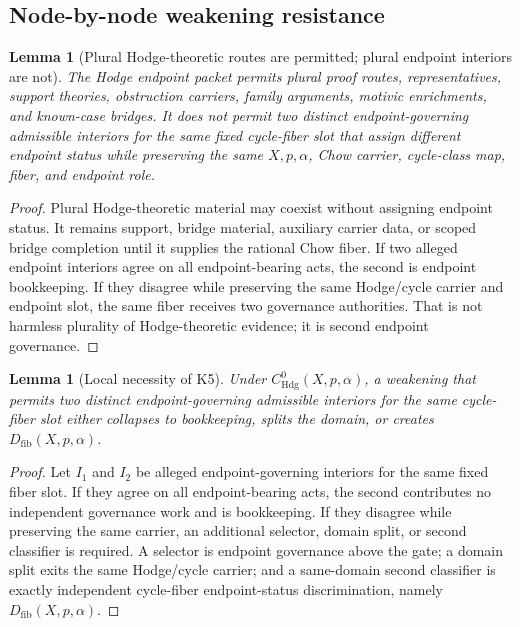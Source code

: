 \documentclass[11pt]{article}
\newtheorem{lemma}[theorem]{Lemma}
\newcommand{\Hdg}{\operatorname{Hdg}}
\begin{document}
\subsection{Node-by-node weakening resistance}

\begin{lemma}[Plural Hodge-theoretic routes are permitted; plural endpoint interiors are not]
The Hodge endpoint packet permits plural proof routes, representatives, support theories, obstruction carriers, family arguments, motivic enrichments, and known-case bridges.  It does not permit two distinct endpoint-governing admissible interiors for the same fixed cycle-fiber slot that assign different endpoint status while preserving the same $X,p,\alpha$, Chow carrier, cycle-class map, fiber, and endpoint role.
\end{lemma}
\begin{proof}
Plural Hodge-theoretic material may coexist without assigning endpoint status.  It remains support, bridge material, auxiliary carrier data, or scoped bridge completion until it supplies the rational Chow fiber.  If two alleged endpoint interiors agree on all endpoint-bearing acts, the second is endpoint bookkeeping.  If they disagree while preserving the same Hodge/cycle carrier and endpoint slot, the same fiber receives two governance authorities.  That is not harmless plurality of Hodge-theoretic evidence; it is second endpoint governance.
\end{proof}

\begin{lemma}[Local necessity of K5]
Under $C^0_{\Hdg}(X,p,\alpha)$, a weakening that permits two distinct endpoint-governing admissible interiors for the same cycle-fiber slot either collapses to bookkeeping, splits the domain, or creates $D_{\mathrm{fib}}(X,p,\alpha)$.
\end{lemma}
\begin{proof}
Let $I_1$ and $I_2$ be alleged endpoint-governing interiors for the same fixed fiber slot.  If they agree on all endpoint-bearing acts, the second contributes no independent governance work and is bookkeeping.  If they disagree while preserving the same carrier, an additional selector, domain split, or second classifier is required.  A selector is endpoint governance above the gate; a domain split exits the same Hodge/cycle carrier; and a same-domain second classifier is exactly independent cycle-fiber endpoint-status discrimination, namely $D_{\mathrm{fib}}(X,p,\alpha)$.
\end{proof}
\end{document}
